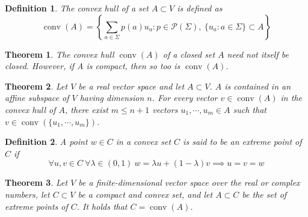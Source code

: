 \documentclass[aps,pra,onecolumn,notitlepage,superscriptaddress]{revtex4-1}
\newcommand{\spc}[1]{\mathcal{#1}}
\newcommand{\op}[1]{\operatorname{#1}}
\newtheorem{theo}{Theorem}
\newtheorem{defi}{Definition}
\begin{document}
    \begin{defi}
       The convex hull of a set $A \subset V$ is defined as
       \begin{equation}
           \op{conv}(A) = \left\{ \sum_{a \in \Sigma} p(a)u_a: p \in \spc P(\Sigma), \ \{ u_a : a \in \Sigma \} \subset A \right\}
       \end{equation}
    \end{defi}
    
    \begin{theo}
        The convex hull $\op{conv}(A)$ of a closed set $A$ need not itself be closed. However, if A is compact, then so too is $\op{conv}(A)$.
    \end{theo}

    \begin{theo}
        Let $V$ be a real vector space and let $A \subset V$. $A$ is contained in an affine subspace of $V$ having dimension $n$. For every vector $v \in \op{conv}(A)$ in the convex hull of $A$, there exist $m \leq n + 1$ vectors $u_1 , \cdots , u_m \in A$ such that $v \in \op{conv} \left(\{u_1, \cdots, u_m\} \right)$. 
    \end{theo}
    
    \begin{defi}
        A point $w \in C$ in a convex set $C$ is said to be an extreme point of $C$ if
        \begin{equation}
            \forall u,v \in C \  \forall \lambda \in (0,1) \ w = \lambda u + (1-\lambda) v \implies u=v=w
        \end{equation}
    \end{defi}

    \begin{theo}
        Let $V$ be a finite-dimensional vector space over the real or complex numbers, let $C \subset V$ be a compact and convex set, and let $A \subset C$ be the set of extreme points of $C$. It holds that $C = \op{conv}(A)$.
    \end{theo}
\end{document}
